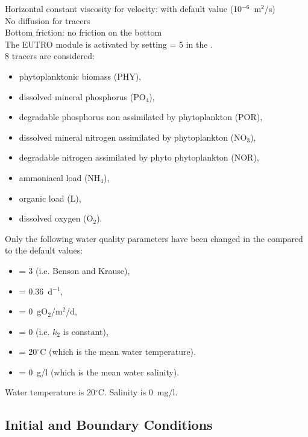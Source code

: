 Horizontal constant viscosity for velocity: with default value
(10$^{-6}$~m$^2$/s)\\
No diffusion for tracers\\
Bottom friction: no friction on the bottom\\

The EUTRO module is activated by setting  = 5
in the  .\\

8 tracers are considered:
\begin{itemize}
\item phytoplanktonic biomass (PHY),
\item dissolved mineral phosphorus (PO$_4$),
\item degradable phosphorus non assimilated by phytoplankton (POR),
\item dissolved mineral nitrogen assimilated by phytoplankton (NO$_3$),
\item degradable nitrogen assimilated by phyto phytoplankton (NOR),
\item ammoniacal load (NH$_4$),
\item organic load (L),
\item dissolved oxygen (O$_2$).
\end{itemize}

Only the following water quality parameters have been changed
in the \waqtel {} compared to the default values:
\begin{itemize}
\item {} = 3 (i.e. Benson and Krause),
\item {} = 0.36~d$^{-1}$,
\item {} = 0~gO$_2$/m$^2$/d,
\item {} = 0 (i.e. $k_2$ is constant),
\item {} = 20$^\circ$C (which is the mean water
temperature).
\item {} = 0~g/l (which is the mean water salinity).
\end{itemize}

Water temperature is 20$^\circ$C. Salinity is 0~mg/l.

\subsection{Initial and Boundary Conditions}

